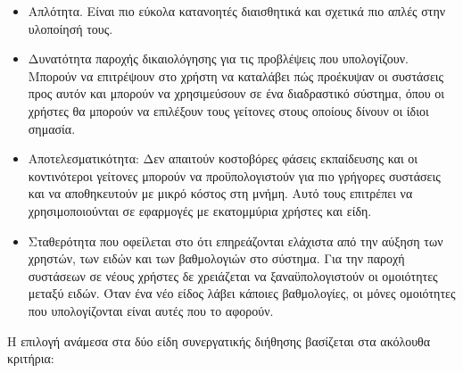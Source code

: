 \begin{itemize}
 \item Απλότητα. Είναι πιο εύκολα κατανοητές διαισθητικά και σχετικά πιο απλές στην υλοποίησή τους. 
 \item Δυνατότητα παροχής δικαιολόγησης για τις προβλέψεις που υπολογίζουν. Μπορούν να επιτρέψουν στο χρήστη να καταλάβει πώς προέκυψαν οι συστάσεις προς αυτόν και μπορούν να χρησιμεύσουν σε ένα διαδραστικό σύστημα, όπου οι χρήστες θα μπορούν να επιλέξουν τους γείτονες στους οποίους δίνουν οι ίδιοι σημασία. 
 \item Αποτελεσματικότητα: Δεν απαιτούν κοστοβόρες φάσεις εκπαίδευσης και οι κοντινότεροι γείτονες μπορούν να προϋπολογιστούν για πιο γρήγορες συστάσεις και να αποθηκευτούν με μικρό κόστος στη μνήμη. Αυτό τους επιτρέπει να χρησιμοποιούνται σε εφαρμογές με εκατομμύρια χρήστες και είδη.
 \item Σταθερότητα που οφείλεται στο ότι επηρεάζονται ελάχιστα από την αύξηση των χρηστών, των ειδών και των βαθμολογιών στο σύστημα. Για την παροχή συστάσεων σε νέους χρήστες δε χρειάζεται να ξαναϋπολογιστούν οι ομοιότητες μεταξύ ειδών. Όταν ένα νέο είδος λάβει κάποιες βαθμολογίες, οι μόνες ομοιότητες που υπολογίζονται είναι αυτές που το αφορούν.
\end{itemize}
Η επιλογή ανάμεσα στα δύο είδη συνεργατικής διήθησης βασίζεται στα ακόλουθα κριτήρια\cite{ricci2011recommender}:
